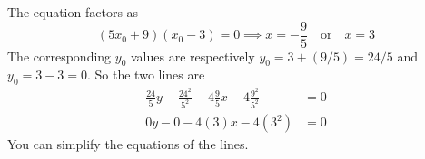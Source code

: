 \documentclass{article}
\begin{document}
\begin{enumerate}
\begin{equation*}
  \end{equation*}
  The equation factors as
  \begin{equation*}
    (5x_0+9)(x_0-3)=0 \implies x=-\frac{9}{5} \quad\mbox{or}\quad x=3
  \end{equation*}
  The corresponding $y_0$ values are respectively $y_0=3+(9/5)=24/5$
  and $y_0=3-3=0$.  So the two lines are
  \begin{align*}
    \frac{24}{5} y - \frac{24^2}{5^2} - 4\frac{9}{5} x - 4\frac{9^2}{5^2} &= 0
    \\
    0 y - 0 - 4(3) x - 4(3^2) &= 0
  \end{align*}
  You can simplify the equations of the lines.
\end{enumerate}
\end{document}
